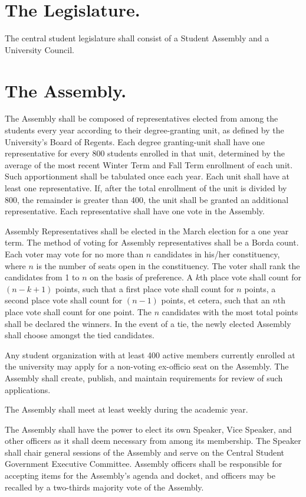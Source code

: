 \section{The Legislature.}
    The central student legislature shall consist of a Student Assembly and a University Council.

\section{The Assembly.}
    The Assembly shall be composed of representatives elected from among the students every year according to their degree-granting unit, as defined by the University's Board of Regents. Each degree granting-unit shall have one representative for every 800 students enrolled in that unit, determined by the average of the most recent Winter Term and Fall Term enrollment of each unit. Such apportionment shall be tabulated once each year. Each unit shall have at least one representative. If, after the total enrollment of the unit is divided by 800, the remainder is greater than 400, the unit shall be granted an additional representative. Each representative shall have one vote in the Assembly.

    Assembly Representatives shall be elected in the March election for a one year term.  The method of voting for Assembly representatives shall be a Borda count. Each voter may vote for no more than $n$ candidates in his/her constituency, where $n$ is the number of seats open in the constituency. The voter shall rank the candidates from 1 to $n$ on the basis of preference.  A $k$th place vote shall count for $(n - k + 1)$ points, such that a first place vote shall count for $n$ points, a second place vote shall count for $(n - 1)$ points, et cetera, such that an $n$th place vote shall count for one point.  The $n$ candidates with the most total points shall be declared the winners.  In the event of a tie, the newly elected Assembly shall choose amongst the tied candidates.

    Any student organization with at least 400 active members currently enrolled at the university may apply for a non-voting ex-officio seat on the Assembly. The Assembly shall create, publish, and maintain requirements for review of such applications.

    The Assembly shall meet at least weekly during the academic year.

    The Assembly shall have the power to elect its own Speaker, Vice Speaker, and other officers as it shall deem necessary from among its membership. The Speaker shall chair general sessions of the Assembly and serve on the Central Student Government Executive Committee. Assembly officers shall be responsible for accepting items for the Assembly's agenda and docket, and officers may be recalled by a two-thirds majority vote of the Assembly.

